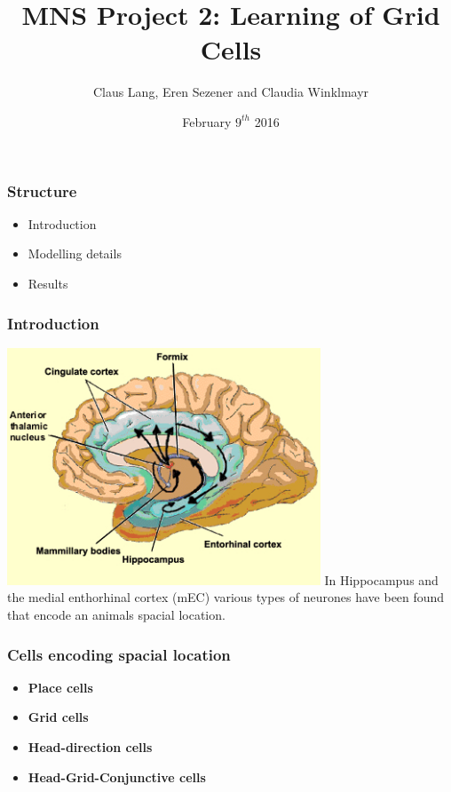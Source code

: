 \documentclass[mathserif]{beamer}
\title[MNS Project 2]{MNS Project 2: Learning of Grid Cells}
\author[C. Lang, E. Sezener, C.Winklmayr]{Claus Lang, Eren Sezener and Claudia Winklmayr}
\institute{BCCN}
\date[9.2.2016]{February $9^{th}$ 2016}
\begin{document}
\maketitle
%
%
%
\begin{frame}
\frametitle{Structure}
	\begin{itemize}
	\item Introduction\newline
	\item Modelling details\newline
	\item Results
	\end{itemize}
\end{frame}
%
%
%
\begin{frame}
\frametitle{Introduction}
\includegraphics[width=0.7\textwidth]{mEC.jpg}\newline
In Hippocampus and the medial enthorhinal cortex (mEC) various types of neurones have been found that encode an animals spacial location.  
\end{frame}
% 
%
%
\begin{frame}
\frametitle{Cells encoding spacial location}
\begin{itemize}
\item \textbf{Place cells} \newline
\item \textbf{Grid cells} \newline
\item \textbf{Head-direction cells}\newline
\item \textbf{Head-Grid-Conjunctive cells}
\end{itemize}
\end{frame}
\end{document}
